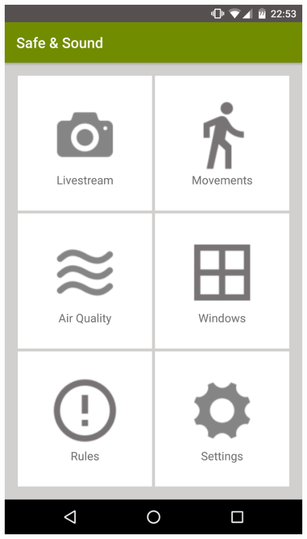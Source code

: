\begin{minipage}[c]{0.5\textwidth}
	\centering
	\includegraphics[scale=0.1]{images/appMain}
	\label{label:main}	
\end{minipage}
